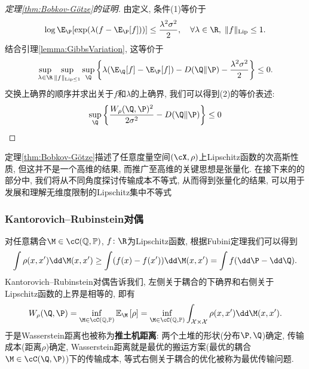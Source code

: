 \begin{proof}[\keben 定理\ref{thm:Bobkov-Götze}的证明]
	由定义, 条件(1)等价于
	\begin{equation*}
		\log \E_{\P} [\exp(\lambda(f - \E_{\P}[f]))] \leq \frac{\lambda^2 \sigma^2}{2}, 
		\quad \forall \lambda \in \R,\; \|f\|_{\text{Lip}} \leq 1. 
	\end{equation*}
	结合引理\ref{lemma:GibbsVariation}, 这等价于
	\begin{equation*}
		\sup_{\lambda \in \R} \sup_{\|f\|_{\text{Lip} \leq 1}} \sup_{\Q} \left\{\lambda(\E_{\Q}[f] - \E_{\P}[f]) - D(\Q \| \P) -  \frac{\lambda^2 \sigma^2}{2} \right\} \leq 0. 
	\end{equation*}
	交换上确界的顺序并求出关于$f$和$\lambda$的上确界, 我们可以得到(2)的等价表述: 
	\begin{equation*}
		\sup_{\Q} \left\{\frac{W_{\rho}(\Q, \P)^2}{2 \sigma^2} - D(\Q \| \P) \right\} \leq 0
	\end{equation*}
\end{proof}

定理\ref{thm:Bobkov-Götze}描述了任意度量空间$(\cX, \rho)$上Lipschitz函数的次高斯性质, 但这并不是一个高维的结果, 而推广至高维的关键思想是张量化.
在接下来的的部分中, 我们将从不同角度探讨传输成本不等式, 从而得到张量化的结果, 可以用于发展和理解无维度限制的Lipschitz集中不等式

\subsubsection{Kantorovich–Rubinstein对偶}

对任意耦合$\M \in \cC(\mathbb{Q}, \mathbb{P})$, $f \colon \R$为Lipschitz函数, 根据Fubini定理我们可以得到
\begin{equation*}
	\int \rho(x, x') \dd \M(x, x')
	\geq \int (f(x) - f(x')) \dd \M(x, x')
	= \int f(\dd \P - \dd \Q). 
\end{equation*}
Kantorovich–Rubinstein对偶告诉我们, 左侧关于耦合的下确界和右侧关于Lipschitz函数的上界是相等的, 即有
\begin{equation*}
	W_{\rho}(\Q, \P)
	= \inf_{\M \in \cC(\mathbb{Q}, \mathbb{P})} \mathbb{E}_{\M} \left[ \rho \right]
	= \inf_{\M \in \cC(\mathbb{Q}, \mathbb{P})} \int_{\mathcal{X} \times \mathcal{X}} \rho(x, x') \dd \M(x, x'). 
\end{equation*}
于是Wasserstein距离也被称为\textbf{推土机距离}: 两个土堆的形状(分布$\P, \Q$)确定, 传输成本(距离$\rho$)确定, Wasserstein距离就是最优的搬运方案(最优的耦合$\M \in \cC(\Q, \P)$)下的传输成本, 等式右侧关于耦合的优化被称为最优传输问题. 


